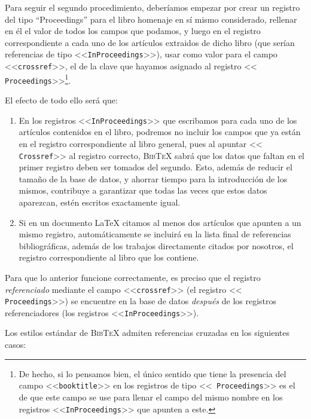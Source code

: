 \documentclass[a4paper,11pt]{article}
\def\btx-{\textsc{Bib\TeX}}
\def\ltx-{\LaTeX}
\def\ltr#1-{<<\texttt{#1}>>}
\begin{document}
Para seguir el segundo procedimiento, deberíamos empezar por crear un registro
del  tipo ``Proceedings''  para el  libro  homenaje en  sí mismo  considerado,
rellenar  en él  el valor  de todos  los  campos que  podamos, y  luego en  el
registro correspondiente a cada uno  de los artículos extraidos de dicho libro
(que serían referencias de tipo  \ltr InProceedings-), usar como valor para el
campo \ltr  crossref-, el de  la clave que  hayamos asignado al  registro \ltr
Proceedings-\footnote{De  hecho, si  lo pensamos  bien, el  único  sentido que
  tiene la presencia  del campo \ltr booktitle- en los  registros de tipo \ltr
  Proceedings- es el de  que este campo se use para llenar  el campo del mismo
  nombre en los registros \ltr InProceedings- que apunten a este.}.

El efecto de todo ello será que:

\begin{enumerate}

\item En los registros \ltr InProceedings- que escribamos para cada uno de los
  artículos  contenidos en el  libro, podremos  no incluir  los campos  que ya
  están en el registro correspondiente  al libro general, pues al apuntar \ltr
  Crossref- al registro  correcto, \btx- sabrá que los datos  que faltan en el
  primer registro  deben ser tomados del  segundo. Esto, además  de reducir el
  tamaño de  la base de  datos, y ahorrar  tiempo para la introducción  de los
  mismos,  contribuye  a  garantizar  que  todas las  veces  que  estos  datos
  aparezcan, estén escritos exactamente igual.

\item Si en un documento \ltx- citamos al menos dos artículos que apunten a un
  mismo registro, automáticamente se incluirá en la lista final de referencias
  bibliográficas, además de los trabajos directamente citados por nosotros, el
  registro correspondiente al libro que los contiene.

\end{enumerate}

Para  que lo  anterior  funcione  correctamente, es  preciso  que el  registro
\emph{referenciado}  mediante  el  campo  \ltr  crossref-  (el  registro  \ltr
Proceedings-) se encuentre en la base de datos \emph{después} de los registros
referenciadores (los registros \ltr InProceedings-).

Los estilos estándar  de \btx- admiten referencias cruzadas  en los siguientes
casos:
\end{document}
